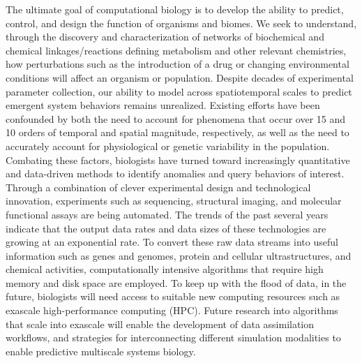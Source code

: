 \par The ultimate goal of computational biology is to develop the ability to predict, control, and design the function of organisms and biomes. We seek to understand, through the discovery and characterization of networks of biochemical and chemical linkages/reactions defining metabolism and other relevant chemistries, how perturbations such as the introduction of a drug or changing environmental conditions will affect an organism or population. Despite decades of experimental parameter collection, our ability to model across spatiotemporal scales to predict emergent system behaviors remains unrealized. Existing efforts have been confounded by both the need to account for phenomena that occur over 15 and 10 orders of temporal and spatial magnitude, respectively, as well as the need to accurately account for physiological or genetic variability in the population. Combating these factors, biologists have turned toward increasingly quantitative and data-driven methods to identify anomalies and query behaviors of interest. Through a combination of clever experimental design and technological innovation, experiments such as sequencing, structural imaging, and molecular functional assays are being automated. The trends of the past several years indicate that the output data rates and data sizes of these technologies are growing at an exponential rate. To convert these raw data streams into useful information such as genes and genomes, protein and cellular ultrastructures, and chemical activities, computationally intensive algorithms that require high memory and disk space are employed. To keep up with the flood of data, in the future, biologists will need access to suitable new computing resources such as exascale high-performance computing (HPC). Future research into algorithms that scale into exascale will enable the development of data assimilation workflows, and strategies for interconnecting different simulation modalities to enable predictive multiscale systems biology.


